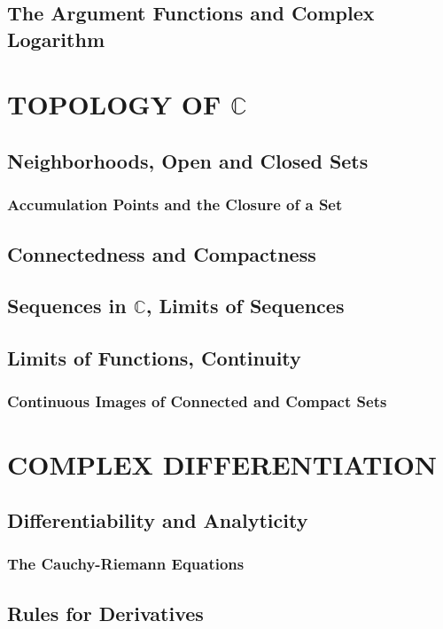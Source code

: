 \documentclass[hidelinks,12pt]{article}
\theoremstyle{definition}
\begin{document}
  \subsection{The Argument Functions and Complex Logarithm}


  \section{TOPOLOGY OF $\mathbb{C}$}
  \subsection{Neighborhoods, Open and Closed Sets}
  \subsubsection{Accumulation Points and the Closure of a Set}
  \subsection{Connectedness and Compactness}
  \subsection{Sequences in $\mathbb{C}$, Limits of Sequences}
  \subsection{Limits of Functions, Continuity}
  \subsubsection{Continuous Images of Connected and Compact Sets}


  \section{COMPLEX DIFFERENTIATION}
  \subsection{Differentiability and Analyticity}
  \subsubsection{The Cauchy-Riemann Equations}
  \subsection{Rules for Derivatives}
\end{document}
